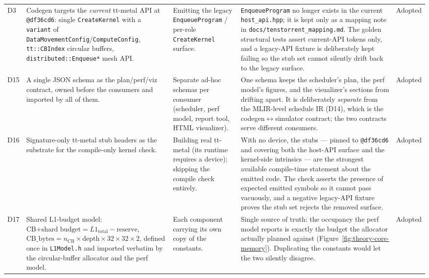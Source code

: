 {\begin{longtable}{@{}p{1.1cm}p{3.55cm}p{2.9cm}p{4.75cm}p{1.5cm}@{}}
D3
& Codegen targets the \emph{current} tt-metal API at \texttt{@df36cd6}: single
  \texttt{CreateKernel} with a \texttt{variant} of
  \texttt{DataMovementConfig}/\allowbreak\texttt{ComputeConfig}, \texttt{tt::CBIndex}
  circular buffers, \texttt{distributed::Enqueue*} mesh API.
& Emitting the legacy \texttt{EnqueueProgram} / per-role \texttt{CreateKernel}
  surface.
& \texttt{EnqueueProgram} no longer exists in the current \texttt{host\_api.hpp};
  it is kept only as a mapping note in \texttt{docs/tenstorrent\_mapping.md}. The
  golden structural tests assert current-API tokens only, and a legacy-API fixture
  is deliberately kept failing so the stub set cannot silently drift back to the
  legacy surface.
& Adopted \\

D15
& A single JSON schema as the plan/perf/viz contract, owned before the consumers
  and imported by all of them.
& Separate ad-hoc schemas per consumer (scheduler, perf model, report tool, HTML
  visualizer).
& One schema keeps the scheduler's plan, the perf model's figures, and the
  visualizer's sections from drifting apart. It is deliberately \emph{separate}
  from the MLIR-level schedule IR (D14), which is the codegen$\leftrightarrow$simulator
  contract; the two contracts serve different consumers.
& Adopted \\

D16
& Signature-only tt-metal stub headers as the substrate for the compile-only
  kernel check.
& Building real tt-metal (its runtime requires a device); skipping the compile
  check entirely.
& With no device, the stubs --- pinned to \texttt{@df36cd6} and covering both the
  host-API surface and the kernel-side intrinsics --- are the strongest available
  compile-time statement about the emitted code. The check asserts the presence of
  expected emitted symbols so it cannot pass vacuously, and a negative legacy-API
  fixture proves the stub set rejects the removed surface.
& Adopted \\

D17
& Shared L1-budget model: $\text{CB+shard budget} = L1_{\text{total}} -
  \text{reserve}$, $\text{CB\_bytes} = n_{\text{CB}} \times \text{depth} \times
  32 \times 32 \times 2$, defined once in \texttt{L1Model.h} and imported verbatim
  by the circular-buffer allocator and the perf model.
& Each component carrying its own copy of the constants.
& Single source of truth: the occupancy the perf model reports is exactly the
  budget the allocator actually planned against (Figure~\ref{fig:theory-core-memory}).
  Duplicating the constants would let the two silently disagree.
& Adopted \\

\end{longtable}
}

